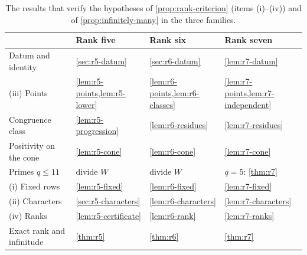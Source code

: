 \begin{table}[htbp]
\centering
\caption{The results that verify the hypotheses of \cref{prop:rank-criterion} (items (i)--(iv)) and of \cref{prop:infinitely-many} in the three families.}
\label{tab:proof-structure}
\small
\begin{tabular}{@{}llll@{}}
\toprule
 & Rank five & Rank six & Rank seven\\
\midrule
Datum and identity & \cref{sec:r5-datum} & \cref{sec:r6-datum} & \cref{lem:r7-datum}\\
(iii) Points & \cref{lem:r5-points,lem:r5-lower} & \cref{lem:r6-points,lem:r6-classes} & \cref{lem:r7-points,lem:r7-independent}\\
Congruence class & \cref{lem:r5-progression} & \cref{lem:r6-residues} & \cref{lem:r7-residues}\\
Positivity on the cone & \cref{lem:r5-cone} & \cref{lem:r6-cone} & \cref{lem:r7-cone}\\
Primes $q\le11$ & divide $W$ & divide $W$ & $q=5$: \cref{thm:r7}\\
(i) Fixed rows & \cref{lem:r5-fixed} & \cref{lem:r6-fixed} & \cref{lem:r7-fixed}\\
(ii) Characters & \cref{sec:r5-characters} & \cref{lem:r6-characters} & \cref{lem:r7-characters}\\
(iv) Ranks & \cref{lem:r5-certificate} & \cref{lem:r6-rank} & \cref{lem:r7-ranks}\\
\midrule
Exact rank and infinitude & \cref{thm:r5} & \cref{thm:r6} & \cref{thm:r7}\\
\bottomrule
\end{tabular}
\end{table}
